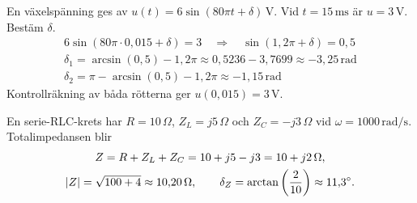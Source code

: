 \begin{exempel}
En växelspänning ges av $u(t) = 6\sin(80\pi t + \delta)\,\text{V}$. Vid $t = 15\,\text{ms}$ är
$u = 3\,\text{V}$. Bestäm $\delta$.
\begin{gather*}
  6\sin(80\pi \cdot 0{,}015 + \delta) = 3 \quad \Rightarrow \quad \sin(1{,}2\pi + \delta) = 0{,}5 \\
  \delta_1 = \arcsin(0{,}5) - 1{,}2\pi \approx 0{,}5236 - 3{,}7699 \approx -3{,}25\,\text{rad} \\
  \delta_2 = \pi - \arcsin(0{,}5) - 1{,}2\pi \approx -1{,}15\,\text{rad}
\end{gather*}
Kontrollräkning av båda rötterna ger $u(0{,}015) = 3\,\text{V}$.
\end{exempel}

\begin{exempel}[Impedansberäkning]
En serie-RLC-krets har $R = 10\,\Omega$, $Z_L = j5\,\Omega$ och $Z_C = -j3\,\Omega$ vid
$\omega = 1000\,\text{rad/s}$. Totalimpedansen blir
\begin{gather*}
  Z = R + Z_L + Z_C = 10 + j5 - j3 = 10 + j2\,\Omega, \\
  \lvert Z\rvert = \sqrt{100 + 4} \approx 10{,}20\,\Omega, \qquad
  \delta_Z = \arctan\left(\frac{2}{10}\right) \approx 11{,}3^{\circ}.
\end{gather*}
\end{exempel}
